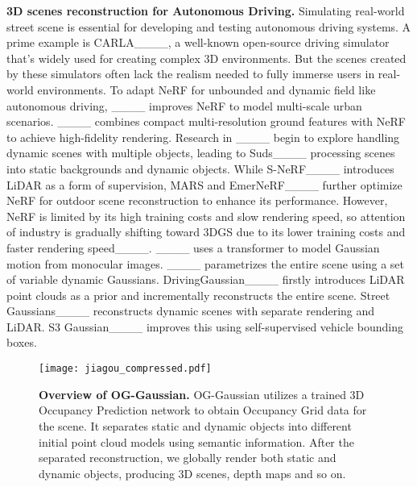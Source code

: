 \noindent\textbf{3D scenes reconstruction for Autonomous Driving. } 
Simulating real-world street scene is essential for developing and testing autonomous driving systems. A prime example is CARLA____, a well-known open-source driving simulator that's widely used for creating complex 3D environments. But the scenes created by these simulators often lack the realism needed to fully immerse users in real-world environments. 
To adapt NeRF for unbounded and dynamic field like autonomous driving, ____ improves NeRF to model multi-scale urban scenarios. ____ combines compact multi-resolution ground features with NeRF to achieve high-fidelity rendering. Research in ____ begin to explore handling dynamic scenes with multiple objects, leading to Suds____ processing scenes into static backgrounds and dynamic objects. While S-NeRF____ introduces LiDAR as a form of supervision, MARS and EmerNeRF____ further optimize NeRF for outdoor scene reconstruction to enhance its performance. However, NeRF is limited by its high training costs and slow rendering speed, so attention of industry is gradually shifting toward 3DGS due to its lower training costs and faster rendering speed____. ____ uses a transformer to model Gaussian motion from monocular images. ____ parametrizes the entire scene using a set of variable dynamic Gaussians. DrivingGaussian____ firstly introduces LiDAR point clouds as a prior and incrementally reconstructs the entire scene. Street Gaussians____ reconstructs dynamic scenes with separate rendering and LiDAR. S3 Gaussian____ improves this using self-supervised vehicle bounding boxes. 

\begin{figure*}[h]
\centering
\texttt{[image: jiagou\_compressed.pdf]}
\vspace{-3pt}
\caption{\textbf{Overview of OG-Gaussian. }OG-Gaussian utilizes a trained 3D Occupancy Prediction network to obtain Occupancy Grid data for the scene. It separates static and dynamic objects into different initial point cloud models using semantic information. After the separated reconstruction, we globally render both static and dynamic objects, producing 3D scenes, depth maps and so on.}
\label{fig:overview}
\vspace{-14pt}
\end{figure*}